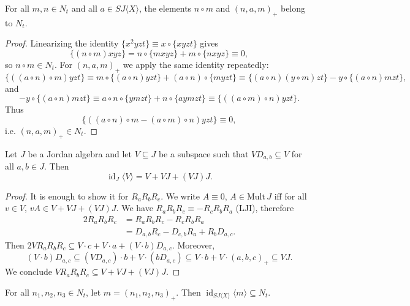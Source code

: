 \documentclass{article}
\begin{document}
\begin{lemma}
For all $m, n \in N_t$ and all $a \in SJ\langle X \rangle$, the elements $n \circ m$ and $(n, a, m)_+$ belong to $N_t$.
\end{lemma}

\begin{proof}
Linearizing the identity $\{x^2 y z t\} \equiv x \circ \{x y z t\}$ gives
\[
\{(n \circ m) x y z\} = n \circ \{m x y z\} + m \circ \{n x y z\} \equiv 0,
\]
so $n \circ m \in N_t$. For $(n, a, m)_+$ we apply the same identity repeatedly:
\[
\{((a \circ n) \circ m) y z t\} \equiv m \circ \{(a \circ n) y z t\} + (a \circ n) \circ \{m y z t\} \equiv \{(a \circ n)(y \circ m) z t\} - y \circ \{(a \circ n) m z t\},
\]
and
\[
- y \circ \{(a \circ n) m z t\} \equiv a \circ n \circ \{y m z t\} + n \circ \{a y m z t\} \equiv \{((a \circ m) \circ n) y z t\}.
\]
Thus
\[
\{((a \circ n) \circ m - (a \circ m) \circ n) y z t\} \equiv 0,
\]
i.e. $(n, a, m)_+ \in N_t$.
\end{proof}

\begin{lemma}
Let $J$ be a Jordan algebra and let $V \subseteq J$ be a subspace such that $V D_{a, b} \subseteq V$ for all $a, b \in J$. Then
\[
\operatorname{id}_J\langle V \rangle = V + VJ + (VJ)J.
\]
\end{lemma}

\begin{proof}
It is enough to show it for $R_a R_b R_c$. We write $A \equiv 0$, $A \in \mathrm{Mult}\,J$ iff for all $v \in V$,
$
v A \in V + VJ + (VJ)J.
$
We have $R_a R_b R_c \equiv -R_c R_b R_a$ (LJI), therefore
\[
\begin{aligned}
2 R_a R_b R_c &= R_a R_b R_c - R_c R_b R_a \\
&= D_{a, b} R_c - D_{c, b} R_a + R_b D_{a, c}.
\end{aligned}
\]
Then $2 V R_a R_b R_c \subseteq V \cdot c + V \cdot a + (V \cdot b) D_{a, c}$. Moreover,
\[
(V \cdot b) D_{a, c} \subseteq (V D_{a, c}) \cdot b + V \cdot (b D_{a, c}) \subseteq V \cdot b + V \cdot (a, b, c)_+ \subseteq VJ.
\]
We conclude $V R_a R_b R_c \subseteq V + VJ + (VJ)J$.
\end{proof}

\begin{theorem}
For all $n_1, n_2, n_3 \in N_t$, let $m = (n_1, n_2, n_3)_+$. Then $\operatorname{id}_{SJ\langle X \rangle}\langle m \rangle \subseteq N_t$.
\end{theorem}
\end{document}
